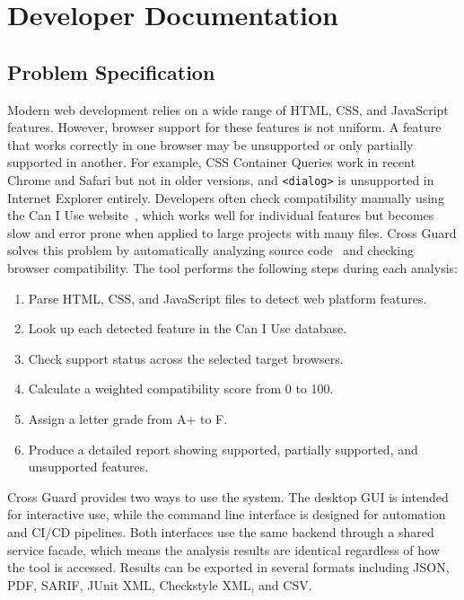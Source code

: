 \chapter{Developer Documentation}
\label{ch:impl}

\section{Problem Specification}
\label{sec:problem-spec}

Modern web development relies on a wide range of HTML, CSS, and JavaScript features. However, browser support for these features is not uniform. A feature that works correctly in one browser may be unsupported or only partially supported in another. For example, CSS Container Queries work in recent Chrome and Safari but not in older versions, and \texttt{<dialog>} is unsupported in Internet Explorer entirely. Developers often check compatibility manually using the Can I Use website~\cite{caniuse}, which works well for individual features but becomes slow and error prone when applied to large projects with many files. Cross Guard solves this problem by automatically analyzing source code~\cite{binkley2007sca} and checking browser compatibility. The tool performs the following steps during each analysis:

\begin{enumerate}
    \item Parse HTML, CSS, and JavaScript files to detect web platform features.
    \item Look up each detected feature in the Can I Use database.
    \item Check support status across the selected target browsers.
    \item Calculate a weighted compatibility score from 0 to 100.
    \item Assign a letter grade from A+ to F.
    \item Produce a detailed report showing supported, partially supported, and unsupported features.
\end{enumerate}

Cross Guard provides two ways to use the system. The desktop GUI is intended for interactive use, while the command line interface is designed for automation and CI/CD pipelines. Both interfaces use the same backend through a shared service facade, which means the analysis results are identical regardless of how the tool is accessed. Results can be exported in several formats including JSON, PDF, SARIF, JUnit XML, Checkstyle XML, and CSV.

